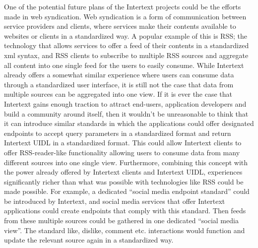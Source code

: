 One of the potential future plans of the Intertext projects could be the efforts made in web syndication. Web syndication is a form of communication between service providers and clients, where services make their contents available to websites or clients in a standardized way. A popular example of this is RSS; the technology that allows services to offer a feed of their contents in a standardized xml syntax, and RSS clients to subscribe to multiple RSS sources and aggregate all content into one single feed for the users to easily consume. While Intertext already offers a somewhat similar experience where users can consume data through a standardized user interface, it is still not the case that data from multiple sources can be aggregated into one view. If it is ever the case that Intertext gains enough traction to attract end-users, application developers and build a community around itself, then it wouldn’t be unreasonable to think that it can introduce similar standards in which the applications could offer designated endpoints to accept query parameters in a standardized format and return Intertext UIDL in a standardized format. This could allow Intertext clients to offer RSS-reader-like functionality allowing users to consume data from many different sources into one single view. Furthermore, combining this concept with the power already offered by Intertext clients and Intertext UIDL, experiences significantly richer than what was possible with technologies like RSS could be made possible. For example, a dedicated “social media endpoint standard” could be introduced by Intertext, and social media services that offer Intertext applications could create endpoints that comply with this standard. Then feeds from these multiple sources could be gathered in one dedicated “social media view”. The standard like, dislike, comment etc. interactions would function and update the relevant source again in a standardized way.